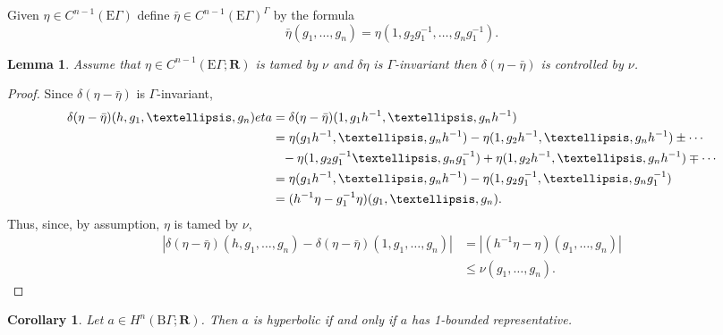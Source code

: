 \documentclass[12pt,reqno,a4paper]{amsart}
\newtheorem{corollary}[subsection]{Corollary}
\newtheorem{lemma}[subsection]{Lemma}
\theoremstyle{definition}
\theoremstyle{remark}
\numberwithin{equation}{section}
\numberwithin{figure}{section}
\newcommand{\B}[1]{{\mathbf #1}}
\newcommand{\R}{\mathrm}
\begin{document}
Given $\eta\in C^{n-1}(\R E\Gamma)$ define $\bar\eta\in C^{n-1}(\R E\Gamma)^\Gamma$
by the formula
$$
\bar\eta(g_1,\dots,g_n)=\eta(1,g_2g_1^{-1},\dots,g_ng_1^{-1}).
$$

\begin{lemma}\label{L:tamed-controlled}
Assume that $\eta\in C^{n-1}(\R E\Gamma;\B R)$ is tamed by $\nu$
and $\delta\eta$ is $\Gamma$-invariant
then $\delta(\eta-\bar\eta)$ is controlled by $\nu$.
\end{lemma}

\begin{proof}
Since $\delta(\eta-\bar\eta)$ is $\Gamma$-invariant,
\begin{align*}
\delta(\eta-\bar\eta)(h,g_1,\dots,g_n)
eta&=\delta(\eta-\bar\eta)(1,g_1h^{-1},\dots,g_nh^{-1})\\
&=\eta(g_1h^{-1},\dots,g_nh^{-1})-\eta(1,g_2h^{-1},\dots,g_nh^{-1})\pm\cdots\\
&\hphantom{=}-\eta(1,g_2g_1^{-1}\dots,g_ng_1^{-1})+\eta(1,g_2h^{-1},\dots,g_nh^{-1})\mp\cdots\\
&=\eta(g_1h^{-1},\dots,g_nh^{-1})-\eta(1,g_2g_1^{-1},\dots,g_ng_1^{-1})\\
&=(h^{-1}\eta-g_1^{-1}\eta)(g_1,\dots,g_n).
\end{align*}
Thus, since, by assumption, $\eta$ is tamed by $\nu$,
\begin{align*}
|\delta(\eta-\bar\eta)(h,g_1,\dots,g_n)-\delta(\eta-\bar\eta)(1,g_1,\dots,g_n)|
&=|(h^{-1}\eta-\eta)(g_1,\dots,g_n)|\\
&\leq\nu(g_1,\dots,g_n).
\end{align*}
\end{proof}

\begin{corollary}\label{C:hyperbolic-1-bounded}
Let $a\in H^n(\R B\Gamma;\B R)$.  Then $a$ is hyperbolic if and only if $a$ has
1-bounded representative.
\end{corollary}
\end{document}

